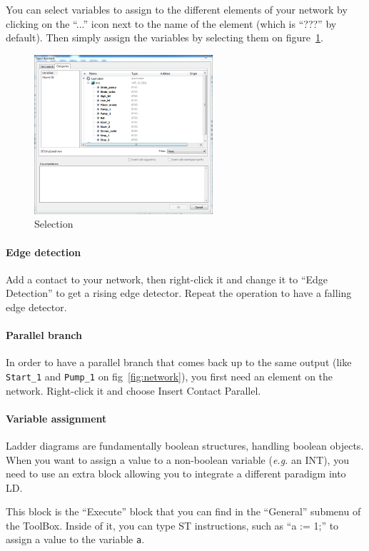 \documentclass[10pt,a4paper]{article}
\begin{document}
You can select variables to assign to the different elements of your network by clicking on the ``...'' icon next to the name of the element (which is ``???'' by default).
Then simply assign the variables by selecting them on figure~\ref{fig:sel}.

\begin{figure}[h!]
	\begin{center}
		\includegraphics[width=250px]{img8.PNG}
	\end{center}
\caption{Selection}
\label{fig:sel}
\end{figure}

\paragraph{Edge detection}
Add a contact to your network, then right-click it and change it to ``Edge Detection'' to get a rising edge detector.
Repeat the operation to have a falling edge detector.

\paragraph{Parallel branch}
In order to have a parallel branch that comes back up to the same output (like \texttt{Start\_1} and \texttt{Pump\_1} on fig~\ref{fig:network}), you first need an element on the network.
Right-click it and choose Insert Contact Parallel.

\paragraph{Variable assignment}
Ladder diagrams are fundamentally boolean structures, handling boolean objects.
When you want to assign a value to a non-boolean variable (\textit{e.g.} an INT), you need to use an extra block allowing you to integrate a different paradigm into LD.

This block is the ``Execute'' block that you can find in the ``General'' submenu of the ToolBox.
Inside of it, you can type ST instructions, such as ``a := 1;'' to assign a value to the variable \texttt{a}.
\end{document}
